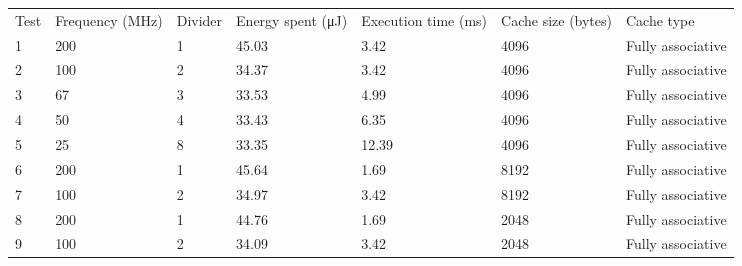 \begin{table}[]
\begin{tabular}{lllllll}
Test & Frequency (MHz) & Divider & Energy spent (μJ) & Execution time (ms) & Cache size (bytes) & Cache type        \\
1    & 200             & 1       & 45.03             & 3.42                & 4096               & Fully associative \\
2    & 100             & 2       & 34.37             & 3.42                & 4096               & Fully associative \\
3    & 67              & 3       & 33.53             & 4.99                & 4096               & Fully associative \\
4    & 50              & 4       & 33.43             & 6.35                & 4096               & Fully associative \\
5    & 25              & 8       & 33.35             & 12.39               & 4096               & Fully associative \\
6    & 200             & 1       & 45.64             & 1.69                & 8192               & Fully associative \\
7    & 100             & 2       & 34.97             & 3.42                & 8192               & Fully associative \\
8    & 200             & 1       & 44.76             & 1.69                & 2048               & Fully associative \\
9    & 100             & 2       & 34.09             & 3.42                & 2048               & Fully associative
\end{tabular}
\end{table}